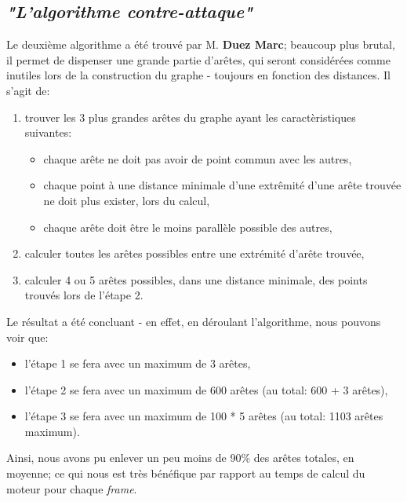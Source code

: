 \documentclass[12pt]{report}
\begin{document}
\begin{spacing}{1.2}
\subsection{\textit{"L'algorithme contre-attaque"}}
Le deuxième algorithme a été trouvé par M. \textbf{Duez Marc}; beaucoup plus brutal, il permet de dispenser une grande partie d'arêtes, qui seront considérées comme inutiles lors de la construction du graphe - toujours en fonction des distances.
\newline
Il s'agit de:
\begin{enumerate}
\item trouver les 3 plus grandes arêtes du graphe ayant les caractèristiques suivantes:
	\begin{itemize}
	\item chaque arête ne doit pas avoir de point commun avec les autres,
	\item chaque point à une distance minimale d'une extrêmité d'une arête trouvée ne doit plus exister, lors du calcul,
	\item chaque arête doit être le moins parallèle possible des autres,
	\end{itemize}
\item calculer toutes les arêtes possibles entre une extrémité d'arête trouvée,
\item calculer 4 ou 5 arêtes possibles, dans une distance minimale, des points trouvés lors de l'étape 2.
\end{enumerate}
Le résultat a été concluant - en effet, en déroulant l'algorithme, nous pouvons voir que:
\begin{itemize}
\item l'étape 1 se fera avec un maximum de 3 arêtes,
\item l'étape 2 se fera avec un maximum de 600 arêtes (au total: 600 + 3 arêtes),
\item l'étape 3 se fera avec un maximum de 100 * 5 arêtes (au total: 1103 arêtes maximum).
\end{itemize}
Ainsi, nous avons pu enlever un peu moins de 90\% des arêtes totales, en moyenne; ce qui nous est très bénéfique par rapport au temps de calcul du moteur pour chaque \textit{frame}.


\end{spacing}
\end{document}

